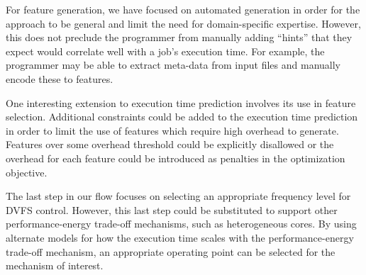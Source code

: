 For feature generation, we have focused on automated generation in order for
the approach to be general and limit the need for domain-specific expertise.
However, this does not preclude the programmer from manually adding ``hints''
that they expect would correlate well with a job's execution time. For example,
the programmer may be able to extract meta-data from input files and manually
encode these to features.

One interesting extension to execution time prediction involves its use in
feature selection. Additional constraints could be added to the execution time
prediction in order to limit the use of features which require high overhead to
generate. Features over some overhead threshold could be explicitly disallowed
or the overhead for each feature could be introduced as penalties in the
optimization objective.

The last step in our flow focuses on selecting an appropriate frequency level
for DVFS control. However, this last step could be substituted to support other
performance-energy trade-off mechanisms, such as heterogeneous cores. By using
alternate models for how the execution time scales with the performance-energy
trade-off mechanism, an appropriate operating point can be selected for the
mechanism of interest.
